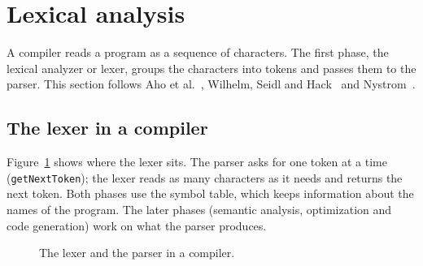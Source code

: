 \section{Lexical analysis}
\label{sec:lexing}

A compiler reads a program as a sequence of characters. The first phase, the
lexical analyzer or lexer, groups the characters into tokens and passes them
to the parser. This section follows Aho et al.~\cite[Ch.~3]{aho2007compilers},
Wilhelm, Seidl and Hack~\cite[Ch.~2--3]{wilhelm2013compiler} and
Nystrom~\cite[Ch.~4--5]{nystrom2021crafting}.

\subsection{The lexer in a compiler}

Figure~\ref{fig:compiler} shows where the lexer sits. The parser asks for one
token at a time (\texttt{getNextToken}); the lexer reads as many characters as
it needs and returns the next token. Both phases use the symbol table, which
keeps information about the names of the program. The later phases
(semantic analysis, optimization and code generation) work on what the parser
produces.

\begin{figure}[h]
\centering
{}
\caption{The lexer and the parser in a compiler.}
\label{fig:compiler}
\end{figure}

